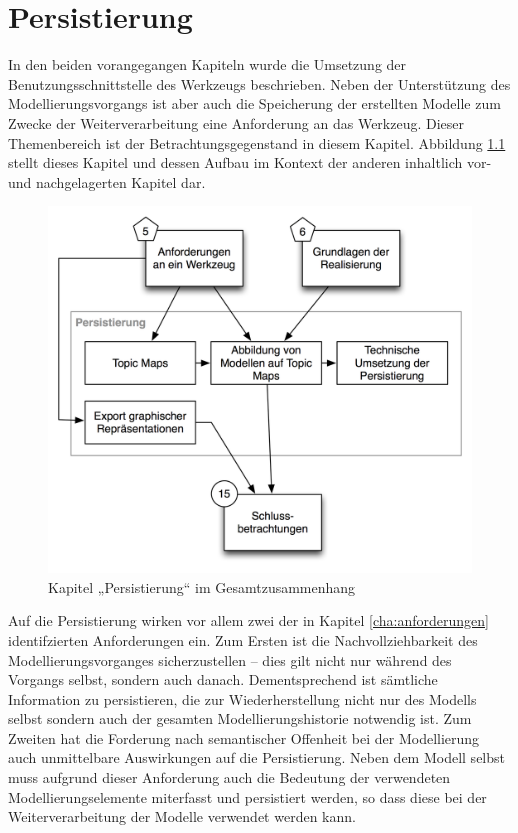 
\chapter{Persistierung} %
\label{cha:persistierung}

In den beiden vorangegangen Kapiteln wurde die Umsetzung der Benutzungsschnittstelle des Werkzeugs beschrieben. Neben der Unterstützung des Modellierungsvorgangs ist aber auch die Speicherung der erstellten Modelle zum Zwecke der Weiterverarbeitung eine Anforderung an das Werkzeug. Dieser Themenbereich ist der Betrachtungsgegenstand in diesem Kapitel. Abbildung \ref{fig:img_Kontextgrafiken_k9} stellt dieses Kapitel und dessen Aufbau im Kontext der anderen inhaltlich vor- und nachgelagerten Kapitel dar.

\begin{figure}[htbp]
	\centering
		\includegraphics[scale=0.6]{img/Kontextgrafiken/k9.png}
	\caption{Kapitel „Persistierung“ im Gesamtzusammenhang}
	\label{fig:img_Kontextgrafiken_k9}
\end{figure}

Auf die Persistierung wirken vor allem zwei der in Kapitel \ref{cha:anforderungen} identifzierten Anforderungen ein. Zum Ersten ist die Nachvollziehbarkeit des Modellierungsvorganges sicherzustellen -- dies gilt nicht nur während des Vorgangs selbst, sondern auch danach. Dementsprechend ist sämtliche Information zu persistieren, die zur Wiederherstellung nicht nur des Modells selbst sondern auch der gesamten Modellierungshistorie notwendig ist. Zum Zweiten hat die Forderung nach semantischer Offenheit bei der Modellierung auch unmittelbare Auswirkungen auf die Persistierung. Neben dem Modell selbst muss aufgrund dieser Anforderung auch die Bedeutung der verwendeten Modellierungselemente miterfasst und persistiert werden, so dass diese bei der Weiterverarbeitung der Modelle verwendet werden kann.

